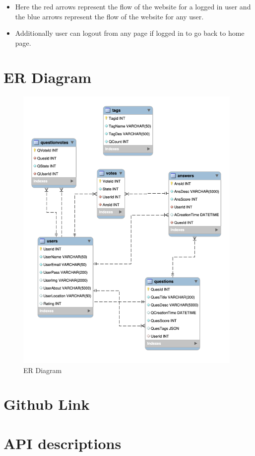 \documentclass{article}
\begin{document}
\newpage


\begin{itemize}
    \item Here the red arrows represent the flow of the website for a logged in user and the blue arrows represent the flow of the website for any user.
    \item Additionally user can logout from any page if logged in to go back to home page.
\end{itemize}
\section{ER Diagram}



\begin{figure}[h]
    \centering
    \includegraphics[width=11cm]{ERD.png}
    \caption[short]{ER Diagram}
    \end{figure}




\section{Github Link}



\section{API descriptions}
\end{document}
